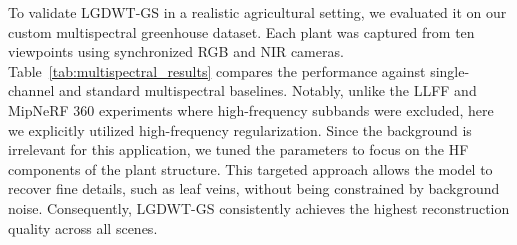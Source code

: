 
To validate LGDWT-GS in a realistic agricultural setting, we evaluated it on our custom multispectral greenhouse dataset. Each plant was captured from ten viewpoints using synchronized RGB and NIR cameras. Table~\ref{tab:multispectral_results} compares the performance against single-channel and standard multispectral baselines. Notably, unlike the LLFF and MipNeRF 360 experiments where high-frequency subbands were excluded, here we explicitly utilized high-frequency regularization. Since the background is irrelevant for this application, we tuned the parameters to focus on the HF components of the plant structure. This targeted approach allows the model to recover fine details, such as leaf veins, without being constrained by background noise. Consequently, LGDWT-GS consistently achieves the highest reconstruction quality across all scenes.

